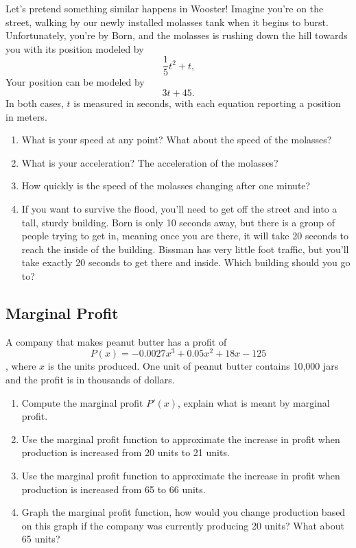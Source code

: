 \documentclass{ximera}
\begin{document}
Let's pretend something similar happens in Wooster! Imagine you're on the street, walking by our newly installed molasses tank when it begins to burst. Unfortunately, you're by Born, and the molasses is rushing down the hill towards you with its position modeled by $$\frac{1}{5}t^2+t \text{,}$$ Your position can be modeled by $$3t+45 \text{.}$$ In both cases, $t$ is measured in seconds, with each equation reporting a position in meters.

\begin{enumerate}
\item{What is your speed at any point? What about the speed of the molasses?}
\item{What is your acceleration? The acceleration of the molasses?}
\item{How quickly is the speed of the molasses changing after one minute?}
\item{If you want to survive the flood, you'll need to get off the street and into a tall, sturdy building. Born is only 10 seconds away, but there is a group of people trying to get in, meaning once you are there, it will take 20 seconds to reach the inside of the building. Bissman has very little foot traffic, but you'll take exactly 20 seconds to get there and inside. Which building should you go to?}
\end{enumerate}


\subsection{Marginal Profit}
A company that makes peanut butter has a profit of $$P(x)=-0.0027x^3+0.05x^2+18x-125$$, where $x$ is the units produced. One unit of peanut butter contains 10,000 jars and the profit is in thousands of dollars.
\begin{enumerate}
\item{Compute the marginal profit $P'(x)$, explain what is meant by marginal profit.} 
\item{Use the marginal profit function to approximate the increase in profit when production is increased from 20 units to 21 units.}
\item{Use the marginal profit function to approximate the increase in profit when production is increased from 65 to 66 units.}
\item{Graph the marginal profit function, how would you change production based on this graph if the company was currently producing 20 units? What about 65 units?}
\end{enumerate}
\end{document}
